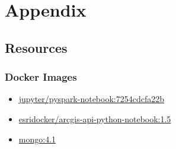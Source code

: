 \documentclass[11 pt]{article}
\theoremstyle{definition}
\theoremstyle{definition}
\begin{document}
\newpage
\section{Appendix}
\subsection{Resources}
\subsubsection{Docker Images}\label{docker-images}
\begin{itemize}
  \item \href{https://hub.docker.com/r/jupyter/pyspark-notebook}{jupyter/pyspark-notebook:7254cdcfa22b}\cite{img-pyspark}
  \item \href{https://hub.docker.com/r/esridocker/arcgis-api-python-notebook}{esridocker/arcgis-api-python-notebook:1.5}\cite{img-esri}
  \item \href{https://hub.docker.com/_/mongo}{mongo:4.1}\cite{img-mongo}
\end{itemize}
\end{document}
